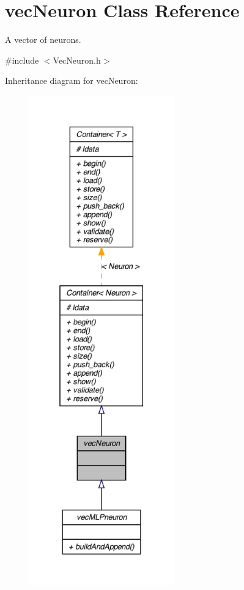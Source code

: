 \hypertarget{classvec_neuron}{
\section{vecNeuron Class Reference}
\label{classvec_neuron}
}


A vector of neurons.  




{\ttfamily \#include $<$VecNeuron.h$>$}



Inheritance diagram for vecNeuron:\nopagebreak
\begin{figure}[H]
\begin{center}
\leavevmode
\includegraphics[height=600pt]{classvec_neuron__inherit__graph}
\end{center}
\end{figure}


